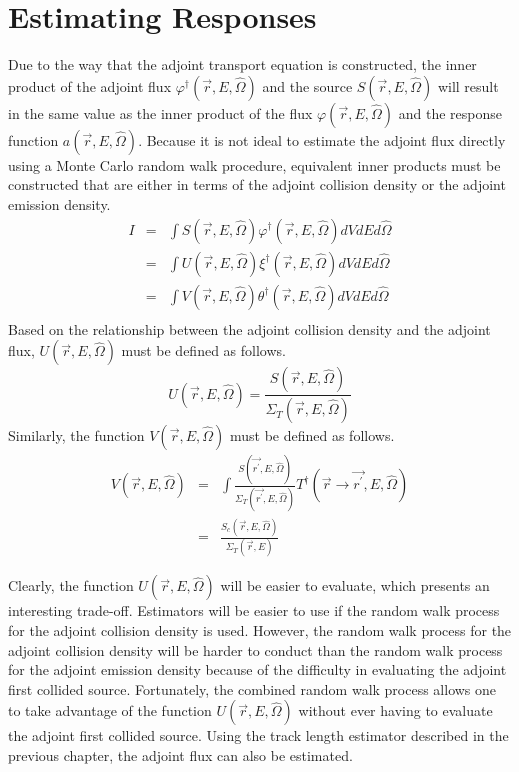 \section{Estimating Responses}
Due to the way that the adjoint transport equation is constructed, the inner
product of the adjoint flux $\varphi^{\dagger}(\vec{r},E,\hat{\Omega})$ and the
source $S(\vec{r},E,\hat{\Omega})$ will result in the same value as the inner 
product of the flux $\varphi(\vec{r},E,\hat{\Omega})$ and the response
function $a(\vec{r},E,\hat{\Omega})$. Because it is not ideal to estimate the
adjoint flux directly using a Monte Carlo random walk procedure, equivalent
inner products must be constructed that are either in terms of the adjoint
collision density or the adjoint emission density.
\begin{eqnarray}
  I & = & \int S(\vec{r},E,\hat{\Omega})\varphi^{\dagger}(\vec{r},E,\hat{\Omega})
  dV dE d\hat{\Omega} \\ 
  & = & \int U(\vec{r},E,\hat{\Omega})\xi^{\dagger}(\vec{r},E,\hat{\Omega})
  dV dE d\hat{\Omega} \\
  & = & \int V(\vec{r},E,\hat{\Omega})\theta^{\dagger}(\vec{r},E,\hat{\Omega})
  dV dE d\hat{\Omega} \\
\end{eqnarray}
Based on the relationship between the adjoint collision density and the
adjoint flux, $U(\vec{r},E,\hat{\Omega})$ must be defined as follows.
\begin{equation}
  U(\vec{r},E,\hat{\Omega}) = \frac{S(\vec{r},E,\hat{\Omega})}
                                   {\Sigma_T(\vec{r},E,\hat{\Omega})}
\end{equation}
Similarly, the function $V(\vec{r},E,\hat{\Omega})$ must be defined as follows.
\begin{eqnarray}
  V(\vec{r},E,\hat{\Omega}) & = & \int \frac{S(\vec{r^{'}},E,\hat{\Omega})}
  {\Sigma_T(\vec{r^{'}},E,\hat{\Omega})} 
  T^{\dagger}(\vec{r} \to \vec{r^{'}},E,\hat{\Omega}) \\
  & = & \frac{S_c(\vec{r},E,\hat{\Omega})}{\Sigma_T(\vec{r},E)}
\end{eqnarray}

Clearly, the function $U(\vec{r},E,\hat{\Omega})$ will be easier to evaluate,
which presents an interesting trade-off. Estimators will be easier to use if
the random walk process for the adjoint collision density is used. However, 
the random walk process for the adjoint collision density will be harder to 
conduct than the random walk process for the adjoint emission density because
of the difficulty in evaluating the adjoint first collided source. Fortunately,
the combined random walk process allows one to take advantage of the function
$U(\vec{r},E,\hat{\Omega})$ without ever having to evaluate the adjoint first 
collided source. Using the track length estimator described in the previous
chapter, the adjoint flux can also be estimated. 
